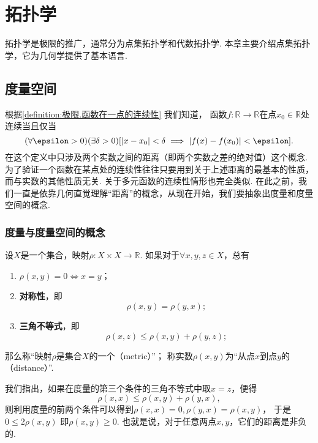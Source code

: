 \chapter{拓扑学}
拓扑学是极限的推广，通常分为点集拓扑学和代数拓扑学.
本章主要介绍点集拓扑学，它为几何学提供了基本语言.

\section{度量空间}
根据\cref{definition:极限.函数在一点的连续性} 我们知道，
函数\(f\colon\mathbb{R}\to\mathbb{R}\)在点\(x_0\in\mathbb{R}\)处连续当且仅当\[
	(\forall\epsilon>0)
	(\exists\delta>0)
	[
		\abs{x - x_0}<\delta
		\implies
		\abs{f(x) - f(x_0)} < \epsilon
	].
\]
在这个定义中只涉及两个实数之间的距离（即两个实数之差的绝对值）这个概念.
为了验证一个函数在某点处的连续性往往只要用到关于上述距离的最基本的性质，而与实数的其他性质无关.
关于多元函数的连续性情形也完全类似.
在此之前，我们一直是依靠几何直觉理解“距离”的概念，从现在开始，我们要抽象出度量和度量空间的概念.

\subsection{度量与度量空间的概念}
\begin{definition}
设\(X\)是一个集合，映射\(\rho\colon X \times X\to\mathbb{R}\).
如果对于\(\forall x,y,z \in X\)，总有\begin{enumerate}
	\item \(\rho(x,y)=0 \iff x=y\)；

	\item {\bf 对称性}，即\[
		\rho(x,y) = \rho(y,x);
	\]

	\item {\bf 三角不等式}，即\[
		\rho(x,z) \leq \rho(x,y) + \rho(y,z);
	\]
\end{enumerate}
那么称“映射\(\rho\)是集合\(X\)的一个（metric）”；
称实数\(\rho(x,y)\)为“从点\(x\)到点\(y\)的（distance）”.
\end{definition}

我们指出，如果在度量的第三个条件的三角不等式中取\(x=z\)，便得\[
	\rho(x,x)\leq\rho(x,y)+\rho(y,x),
\]
则利用度量的前两个条件可以得到\(\rho(x,x)=0,\rho(y,x)=\rho(x,y)\)，
于是\(0\leq2\rho(x,y)\)
即\(\rho(x,y)\geq0\).
也就是说，对于任意两点\(x,y\)，它们的距离是非负的.

